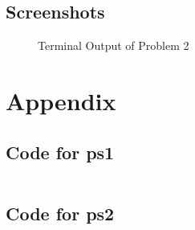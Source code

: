 \documentclass[12pt]{article}
\begin{document}
	
			
			
			
				
				
		\subsection{Screenshots}
		
			\begin{figure}[h!]
				\centering
				\caption{Terminal Output of Problem 2}
			\end{figure}
		
	\section{Appendix}
	
	
		\subsection{Code for ps1}
		
			\begin{verbatim}
			\end{verbatim}
			
		
		\subsection{Code for ps2}
		
			
		
		
		
\end{document}
